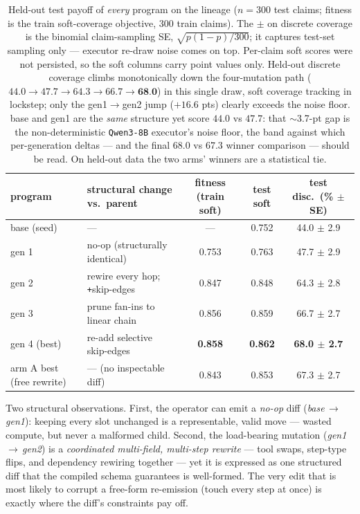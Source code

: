 \documentclass[11pt]{article}
\newcommand{\armA}{\textcolor{bad}{arm A}}
\begin{document}
\begin{table}[H]\centering\footnotesize
\begin{tabular}{llccc}
\toprule
program & structural change vs.\ parent & fitness (train soft) & test soft & test disc.\ (\% $\pm$ SE) \\
\midrule
base (seed)     & ---                              & ---   & 0.752 & 44.0 $\pm$ 2.9 \\
gen 1           & no-op (structurally identical)   & 0.753 & 0.763 & 47.7 $\pm$ 2.9 \\
gen 2           & rewire every hop; \texttt{+}skip-edges & 0.847 & 0.848 & 64.3 $\pm$ 2.8 \\
gen 3           & prune fan-ins to linear chain    & 0.856 & 0.859 & 66.7 $\pm$ 2.7 \\
gen 4 (best)    & re-add selective skip-edges      & \textbf{0.858} & \textbf{0.862} & \textbf{\textcolor{good}{68.0 $\pm$ 2.7}} \\
\midrule
\armA{} best (free rewrite) & --- (no inspectable diff) & 0.843 & 0.853 & 67.3 $\pm$ 2.7 \\
\bottomrule
\end{tabular}
\caption{Held-out test payoff of \emph{every} program on the lineage ($n=300$ test claims; fitness
is the train soft-coverage objective, 300 train claims). The $\pm$ on discrete coverage is the
binomial claim-sampling SE, $\sqrt{p(1-p)/300}$; it captures test-set sampling only --- executor
re-draw noise comes on top. Per-claim soft scores were not persisted, so the soft columns carry
point values only. Held-out discrete coverage climbs
monotonically down the four-mutation path ($44.0\to47.7\to64.3\to66.7\to\textbf{68.0}$) in this
single draw, soft coverage tracking in lockstep; only the gen1$\to$gen2 jump ($+16.6$ pts)
clearly exceeds the noise floor. base and gen1 are the \emph{same} structure yet score $44.0$ vs $47.7$: that
$\sim$3.7-pt gap is the non-deterministic \texttt{Qwen3-8B} executor's noise floor, the band
against which per-generation deltas --- and the final $68.0$ vs $67.3$ winner comparison ---
should be read. On held-out data the two arms' winners are a statistical tie.}
\label{tab:lineagetest}
\end{table}

\noindent Two structural observations. First, the operator can emit a \emph{no-op} diff
(\emph{base\,$\to$\,gen1}): keeping every slot unchanged is a representable, valid move --- wasted
compute, but never a malformed child. Second, the load-bearing mutation (\emph{gen1\,$\to$\,gen2})
is a \emph{coordinated multi-field, multi-step rewrite} --- tool swaps, step-type flips, and
dependency rewiring together --- yet it is expressed as one structured diff that the compiled
schema guarantees is well-formed. The very edit that is most likely to corrupt a free-form
re-emission (touch every step at once) is exactly where the diff's constraints pay off.
\end{document}
